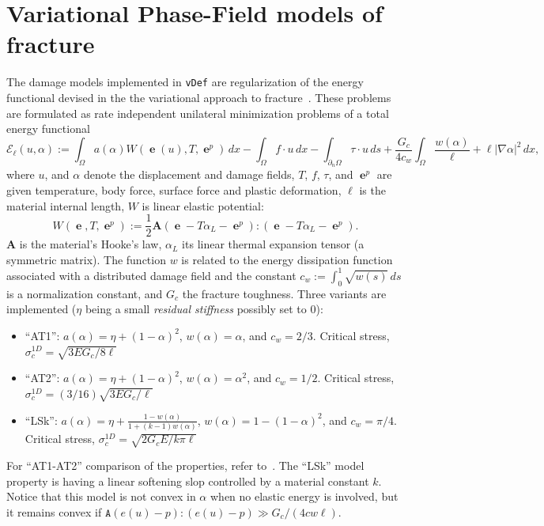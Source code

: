 \documentclass[10pt,oneside]{memoir}
\def\vDef{{\texttt{vDef}} }
\DeclareMathOperator{\e}{{\mathbf e}}
\begin{document}
\section{Variational Phase-Field models of fracture}
\label{sec:GradientDamageModels}
The damage models implemented in \vDef are regularization of the energy functional devised in the the variational approach to fracture~\cite{Ambrosio-Tortorelli-1990,Ambrosio-Tortorelli-1992,Giacomini-2005,Sicsic-Marigo-2013a}. These problems are formulated as rate independent unilateral minimization problems of a total energy functional
\begin{equation}
	\label{eq:defEll}
	\mathcal{E}_\ell(u,\alpha) := \int_\Omega a(\alpha) W(\e(u),T,\e^p)\, dx - \int_\Omega f\cdot u \, dx - \int_{\partial_n \Omega} \tau \cdot u \, ds + \frac{G_c}{4c_w} \int_\Omega \frac{w(\alpha)}{\ell} + \ell|\nabla \alpha|^2\, dx,
\end{equation}
where $u$, and $\alpha$ denote the displacement and damage fields, $T$, $f$, $\tau$, and $\e^p$ are given temperature, body force, surface force and plastic deformation, $\ell$ is the material internal length, $W$ is linear elastic potential:
$$
W(\e,T,\e^p) := \frac{1}{2} \mathbf{A}\left(\e-T \alpha_L-\e^p\right):\left(\e-T \alpha_L-\e^p\right).
$$
$\mathbf{A}$ is the material's Hooke's law, $\alpha_L$ its linear thermal expansion tensor (a symmetric matrix).
The function $w$ is related to the energy dissipation function associated with a distributed damage field and the constant $c_w:= \int_0^1 \sqrt{w(s)}\, ds$ is a normalization constant, and $G_c$ the fracture toughness.
Three variants are implemented ($\eta$ being a small \emph{residual stiffness} possibly set to 0):
\begin{itemize}
\item ``AT1'': $a(\alpha) = \eta + (1-\alpha)^2$, $w(\alpha) = \alpha$, and $c_w =2/3$. Critical stress, $\sigma_c^{1D} = \sqrt{3EG_c/8\ell}$
\item ``AT2'': $a(\alpha) = \eta + (1-\alpha)^2$, $w(\alpha) = \alpha^2$, and $c_w = 1/2$. Critical stress,  $\sigma_c^{1D} = (3/16) \sqrt{3EG_c/\ell}$
\item ``LSk'': $a(\alpha) =  \eta + \frac{1-w(\alpha)}{1+(k-1)w(\alpha)}$, $w(\alpha) = 1- (1-\alpha)^2$, and $c_w =\pi/4$.  Critical stress, $\sigma_c^{1D} = \sqrt{2G_cE/k\pi\ell}$
\end{itemize}
For ``AT1-AT2'' comparison of the properties, refer to~\cite{Pham-Amor-EtAl-2011a}. The ``LSk'' model property is having a linear softening slop controlled by a material constant $k$. Notice that this model is not convex in $\alpha$ when no elastic energy is involved, but it remains convex if $\mathtt{A}(e(u)-p):(e(u)-p) \gg G_c/(4cw\ell)$.
\end{document}
